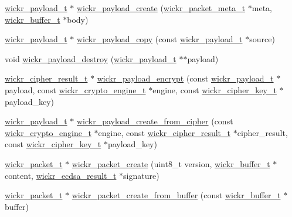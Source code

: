 \begin{DoxyCompactItemize}
\item 
\mbox{\hyperlink{structwickr__payload}{wickr\+\_\+payload\+\_\+t}} $\ast$ \mbox{\hyperlink{group__wickr__protocol_gad7d51d39a8477d87557536ff42399186}{wickr\+\_\+payload\+\_\+create}} (\mbox{\hyperlink{structwickr__packet__meta}{wickr\+\_\+packet\+\_\+meta\+\_\+t}} $\ast$meta, \mbox{\hyperlink{structwickr__buffer}{wickr\+\_\+buffer\+\_\+t}} $\ast$body)
\item 
\mbox{\hyperlink{structwickr__payload}{wickr\+\_\+payload\+\_\+t}} $\ast$ \mbox{\hyperlink{group__wickr__protocol_ga96e1b0eabf307d112985946cbe2f6969}{wickr\+\_\+payload\+\_\+copy}} (const \mbox{\hyperlink{structwickr__payload}{wickr\+\_\+payload\+\_\+t}} $\ast$source)
\item 
void \mbox{\hyperlink{group__wickr__protocol_ga821c48aa748408e47ba2149e1628a487}{wickr\+\_\+payload\+\_\+destroy}} (\mbox{\hyperlink{structwickr__payload}{wickr\+\_\+payload\+\_\+t}} $\ast$$\ast$payload)
\item 
\mbox{\hyperlink{structwickr__cipher__result}{wickr\+\_\+cipher\+\_\+result\+\_\+t}} $\ast$ \mbox{\hyperlink{group__wickr__protocol_ga7e4fd2ad4de22c2f7d6160400d2e15e7}{wickr\+\_\+payload\+\_\+encrypt}} (const \mbox{\hyperlink{structwickr__payload}{wickr\+\_\+payload\+\_\+t}} $\ast$payload, const \mbox{\hyperlink{structwickr__crypto__engine}{wickr\+\_\+crypto\+\_\+engine\+\_\+t}} $\ast$engine, const \mbox{\hyperlink{structwickr__cipher__key}{wickr\+\_\+cipher\+\_\+key\+\_\+t}} $\ast$payload\+\_\+key)
\item 
\mbox{\hyperlink{structwickr__payload}{wickr\+\_\+payload\+\_\+t}} $\ast$ \mbox{\hyperlink{group__wickr__protocol_gaeeebf95ba580b92254a91009245028ee}{wickr\+\_\+payload\+\_\+create\+\_\+from\+\_\+cipher}} (const \mbox{\hyperlink{structwickr__crypto__engine}{wickr\+\_\+crypto\+\_\+engine\+\_\+t}} $\ast$engine, const \mbox{\hyperlink{structwickr__cipher__result}{wickr\+\_\+cipher\+\_\+result\+\_\+t}} $\ast$cipher\+\_\+result, const \mbox{\hyperlink{structwickr__cipher__key}{wickr\+\_\+cipher\+\_\+key\+\_\+t}} $\ast$payload\+\_\+key)
\item 
\mbox{\hyperlink{structwickr__packet}{wickr\+\_\+packet\+\_\+t}} $\ast$ \mbox{\hyperlink{group__wickr__protocol_gac952913ddaf848d2def181cd55b30883}{wickr\+\_\+packet\+\_\+create}} (uint8\+\_\+t version, \mbox{\hyperlink{structwickr__buffer}{wickr\+\_\+buffer\+\_\+t}} $\ast$content, \mbox{\hyperlink{structwickr__ecdsa__result}{wickr\+\_\+ecdsa\+\_\+result\+\_\+t}} $\ast$signature)
\item 
\mbox{\hyperlink{structwickr__packet}{wickr\+\_\+packet\+\_\+t}} $\ast$ \mbox{\hyperlink{group__wickr__protocol_ga3427a40815c9f65a78516405d1b88072}{wickr\+\_\+packet\+\_\+create\+\_\+from\+\_\+buffer}} (const \mbox{\hyperlink{structwickr__buffer}{wickr\+\_\+buffer\+\_\+t}} $\ast$buffer)
$$
\end{DoxyCompactItemize}
